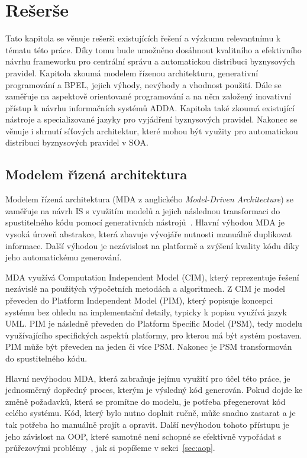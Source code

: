 
\chapter{Rešerše}\label{ch:reserse}

Tato kapitola se věnuje rešerši existujících řešení
a výzkumu relevantnímu k tématu této práce. Díky tomu bude umožněno
dosáhnout kvalitního a efektivního návrhu frameworku pro centrální správu a automatickou
distribuci byznysových pravidel.
Kapitola zkoumá modelem řízenou architekturu, generativní
programování a BPEL, jejich výhody, nevýhody a vhodnost použití.
Dále se zaměřuje na aspektově orientované programování
a na něm založený inovativní přístup k návrhu informačních systémů \gls{ADDA}.
Kapitola také zkoumá existující nástroje a specializované jazyky pro vyjádření
byznysových pravidel.
Nakonec se věnuje i shrnutí síťových architektur, které mohou být využity
pro automatickou distribuci byznysových pravidel v \gls{SOA}.

\section{Modelem ř\'{\i}zená architektura}

Modelem řízená architektura (\gls{MDA} z anglického \textit{Model-Driven
Architecture}) se zaměřuje na návrh \gls{IS} s využitím modelů a jejich
následnou transformaci do spustitelného kódu pomocí generativních nástrojů~\cite{soley2000model}.
Hlavní výhodou \gls{MDA} je vysoká úroveň abstrakce, která zbavuje vývojáře nutnosti
manuálně duplikovat informace. Další výhodou je nezávislost na platformě a zvýšení
kvality kódu díky jeho automatickému generování.

\gls{MDA} využívá Computation Independent Model (\gls{CIM}), který reprezentuje
řešení nezávislé na použitých výpočetních metodách a algoritmech. Z \gls{CIM} je
model převeden do Platform Independent Model (\gls{PIM}),
který popisuje koncepci systému bez ohledu na implementační detaily, typicky k popisu
využívá jazyk \gls{UML}. \gls{PIM} je následně převeden do
Platform Specific Model (\gls{PSM}), tedy modelu využívajícího
specifických aspektů platformy, pro kterou má být systém postaven.
\gls{PIM} může být převeden na jeden či více \gls{PSM}.
Nakonec je \gls{PSM} transformován do spustitelného kódu.

Hlavní nevýhodou \gls{MDA}, která zabraňuje jejímu využití
pro účel této práce, je jednosměrný dopředný proces, kterým je výsledný kód generován.
Pokud dojde ke změně požadavků, která se promítne do modelu, je potřeba přegenerovat
kód celého systému. Kód, který bylo nutno doplnit ručně, může snadno zastarat a je tak
potřeba ho manuálně projít a opravit.
Další nevýhodou tohoto přístupu je jeho závislost na \gls{OOP},
které samotné není schopné se efektivně vypořádat s průřezovými
problémy~\cite{cemus2014aspect}, jak si popíšeme v sekci~\ref{sec:aop}.

